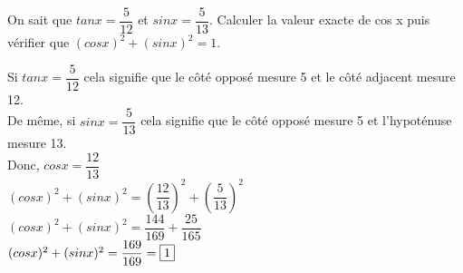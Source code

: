 \documentclass[a4paper,11pt]{article}
\begin{document}
On sait que $tan x =  \dfrac{5}{12}$  et $sin x =  \dfrac{5}{13} $. 
Calculer la valeur exacte de cos x puis vérifier que $(cos x)^{2} + (sin x)^{2} = 1$.\\

\red

Si $tan x =  \dfrac{5}{12}$ cela signifie que le côté opposé mesure 5 et le côté adjacent mesure 12.\\
De même, si $sin x =  \dfrac{5}{13} $ cela signifie que le côté opposé mesure 5 et l'hypoténuse mesure 13.\\

Donc, $cos x = \dfrac{12}{13}$\\

$(cos x)^{2} + (sin x)^{2} = (\dfrac{12}{13})^{2} + (\dfrac{5}{13})^{2} $\\

$(cos x)^{2} + (sin x)^{2} = \dfrac{144}{169} + \dfrac{25}{165} $\\

$(cos x)^{2} + (sin x)^{2} = \dfrac{169}{169} = \fbox{1} $\\
\end{document}
